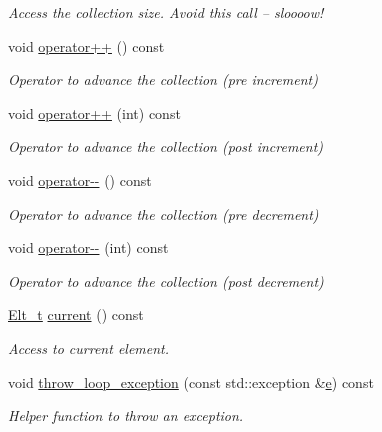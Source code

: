 \begin{DoxyCompactItemize}
\begin{DoxyCompactList}\small\item\em Access the collection size. Avoid this call -- sloooow! \end{DoxyCompactList}\item 
void \hyperlink{class_d_d4hep_1_1_x_m_l_1_1_collection__t_a4a00ad30df1a6748eaddd31049ca105d}{operator++} () const
\begin{DoxyCompactList}\small\item\em Operator to advance the collection (pre increment) \end{DoxyCompactList}\item 
void \hyperlink{class_d_d4hep_1_1_x_m_l_1_1_collection__t_a6eff27d291d88d0e36f8aef829b3acc1}{operator++} (int) const
\begin{DoxyCompactList}\small\item\em Operator to advance the collection (post increment) \end{DoxyCompactList}\item 
void \hyperlink{class_d_d4hep_1_1_x_m_l_1_1_collection__t_a91fb9a280c6e17c0f1327f2d96a6fa4f}{operator-\/-\/} () const
\begin{DoxyCompactList}\small\item\em Operator to advance the collection (pre decrement) \end{DoxyCompactList}\item 
void \hyperlink{class_d_d4hep_1_1_x_m_l_1_1_collection__t_a4521013ebd56ddec60ece3e8a5bb0192}{operator-\/-\/} (int) const
\begin{DoxyCompactList}\small\item\em Operator to advance the collection (post decrement) \end{DoxyCompactList}\item 
\hyperlink{class_d_d4hep_1_1_x_m_l_1_1_handle__t_a81a72155f29971b37652430a334a6b30}{Elt\+\_\+t} \hyperlink{class_d_d4hep_1_1_x_m_l_1_1_collection__t_a17ee76aff895acb4928cf3a157da4fc5}{current} () const
\begin{DoxyCompactList}\small\item\em Access to current element. \end{DoxyCompactList}\item 
void \hyperlink{class_d_d4hep_1_1_x_m_l_1_1_collection__t_ab3cc2f0d13537260157a36ace7ed0f0d}{throw\+\_\+loop\+\_\+exception} (const std\+::exception \&\hyperlink{_volumes_8cpp_a8a9a1f93e9b09afccaec215310e64142}{e}) const
\begin{DoxyCompactList}\small\item\em Helper function to throw an exception. \end{DoxyCompactList}\item 

\end{DoxyCompactItemize}
